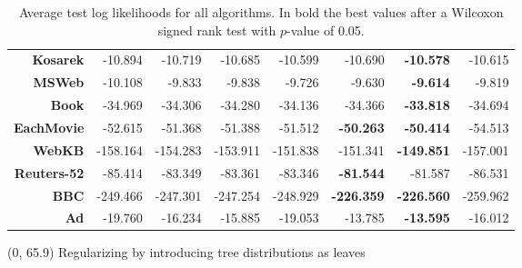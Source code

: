 \documentclass[final]{beamer}
\begin{document}
\begin{frame}{}
\begin{textblock}{25.7}
\begin{table}[!htbp]
\begin{tabular}{r r r r r r r r}
          \textbf{Kosarek}    & -10.894           & -10.719        & -10.685         & -10.599          & -10.690           & \textbf{-10.578}  & -10.615          \\
          \textbf{MSWeb}      & -10.108           & -9.833         & -9.838          & -9.726           & -9.630            & \textbf{-9.614}   & -9.819           \\
          \textbf{Book}       & -34.969           & -34.306        & -34.280         & -34.136          & -34.366           & \textbf{-33.818}  & -34.694          \\
          \textbf{EachMovie}  & -52.615           & -51.368        & -51.388         & -51.512          & \textbf{-50.263}  & \textbf{-50.414}  & -54.513          \\
          \textbf{WebKB}      & -158.164          & -154.283       & -153.911        & -151.838         & -151.341          & \textbf{-149.851} & -157.001         \\
          \textbf{Reuters-52} & -85.414           & -83.349        & -83.361         & -83.346          & \textbf{-81.544}  & -81.587           & -86.531          \\
          \textbf{BBC}        & -249.466          & -247.301       & -247.254        & -248.929         & \textbf{-226.359} & \textbf{-226.560} & -259.962         \\
          \textbf{Ad}         & -19.760           & -16.234        & -15.885         & -19.053          & -13.785           & \textbf{-13.595}  & -16.012          \\
          \bottomrule
        \end{tabular}
        \caption[Experimentation results]{\scriptsize Average test
          log likelihoods for all algorithms. In bold the best values
          after a Wilcoxon signed rank test with $p$-value of 0.05.}
        \label{tab:resexp}
      \end{table}   



      
      \end{textblock}


        
  \begin{textblock}{80}(0, 65.9)
    Regularizing by introducing tree distributions as leaves
  \end{textblock}
  

\end{frame}
\end{document}
